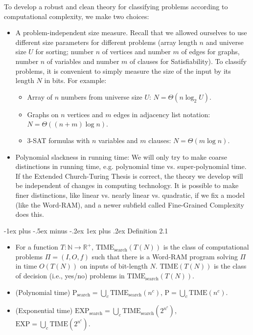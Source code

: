 \documentclass[10pt,landscape]{article}
\makeatletter
\renewcommand{\subsubsection}{\@startsection{subsubsection}{3}{0mm}%
                                {-1ex plus -.5ex minus -.2ex}%
                                {1ex plus .2ex}%
                                {\normalfont\small\bfseries}}
\makeatother
\begin{document}
\begin{multicols*}{3}
To develop a robust and clean theory for classifying problems according to computational complexity, we make two choices:
\begin{itemize}
  \item A problem-independent size measure. Recall that we allowed ourselves to use different size parameters for different problems (array length $n$ and universe size $U$ for sorting; number $n$ of vertices and number $m$ of edges for graphs, number $n$ of variables and number $m$ of clauses for Satisfiability). To classify problems, it is convenient to simply measure the size of the input by its length $N$ in bits. For example:
    \begin{itemize}
      \item Array of $n$ numbers from universe size $U$: $N = \Theta(n \log_2 U)$.
      \item Graphs on $n$ vertices and $m$ edges in adjacency list notation: $N = \Theta((n + m) \log n)$.
      \item 3-SAT formulas with $n$ variables and $m$ clauses: $N = \Theta(m \log n)$.
    \end{itemize}
  \item Polynomial slackness in running time: We will only try to make coarse distinctions in running time, e.g. polynomial time vs. super-polynomial time. If the Extended Church-Turing Thesis is correct, the theory we develop will be independent of changes in computing technology. It is possible to make finer distinctions, like linear vs. nearly linear vs. quadratic, if we fix a model (like the Word-RAM), and a newer subfield called Fine-Grained Complexity does this.
\end{itemize}

\subsubsection{Definition 2.1}
\begin{itemize}
  \item For a function $T : \mathbb{N} \rightarrow \mathbb{R}^+$, $\text{TIME}_{\text{search}}(T(N))$ is the class of computational problems $\Pi = (I, O, f)$ such that there is a Word-RAM program solving $\Pi$ in time $O(T(N))$ on inputs of bit-length $N$.
  $\text{TIME}(T(N))$ is the class of decision (i.e., yes/no) problems in $\text{TIME}_{\text{search}}(T(N))$.
  \item (Polynomial time) $\text{P}_{\text{search}} = \bigcup_c \text{TIME}_{\text{search}}(n^c)$, $\text{P} = \bigcup_c \text{TIME}(n^c)$.
  \item (Exponential time) $\text{EXP}_{\text{search}} = \bigcup_c \text{TIME}_{\text{search}}(2^{n^c})$, $\text{EXP} = \bigcup_c \text{TIME}(2^{n^c})$.
\end{itemize}


\end{multicols*}
\end{document}
